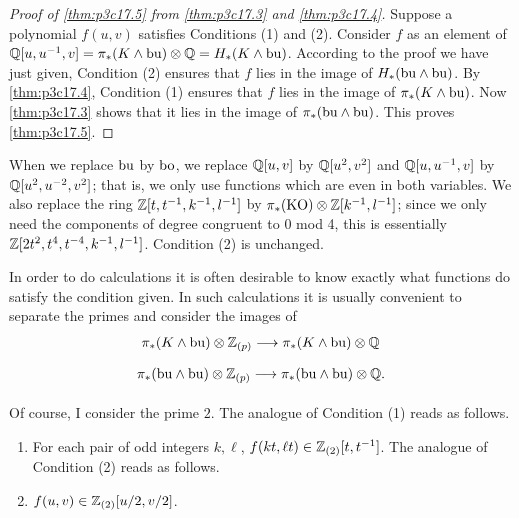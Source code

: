 \documentclass[../main]{subfiles}
\begin{document}
\begin{proof}[Proof of \ref{thm:p3c17.5} from \ref{thm:p3c17.3} and \ref{thm:p3c17.4}]
Suppose a polynomial $f(u,v)$ satisfies Conditions (1) and (2). Consider $f$ as an element of $\mathbb{Q}[u,u^{-1},v] = \pi_*(K\wedge\mathrm{bu})\otimes\mathbb{Q} = H_*(K\wedge\mathrm{bu})$. According to the proof we have just given, Condition (2) ensures that $f$ lies in the image of $H_*(\mathrm{bu}\wedge\mathrm{bu})$. By \ref{thm:p3c17.4}, Condition (1) ensures that $f$ lies in the image of $\pi_*(K\wedge\mathrm{bu})$. Now \ref{thm:p3c17.3} shows that it lies in the image of $\pi_*(\mathrm{bu}\wedge\mathrm{bu})$. This proves \ref{thm:p3c17.5}.
\end{proof}

\begin{remark*}
When we replace $\mathrm{bu}$ by $\mathrm{bo}$, we replace $\mathbb{Q}[u,v]$ by $\mathbb{Q}[u^2,v^2]$ and $\mathbb{Q}[u,u^{-1},v]$ by $\mathbb{Q}[u^2,u^{-2},v^2]$; that is, we only use functions which are even in both variables. We also replace the ring $\mathbb{Z}[t,t^{-1},k^{-1},l^{-1}]$ by $\pi_*(\mathrm{KO})\otimes\mathbb{Z}[k^{-1},l^{-1}]$; since we only need the components of degree congruent to 0 mod 4, this is essentially
$\mathbb{Z}[2t^2,t^4,t^{-4},k^{-1},l^{-1}]$. Condition (2) is unchanged.

In order to do calculations it is often desirable to know exactly what functions do satisfy the condition given. In such calculations it is usually convenient to separate the primes and consider the images of \[\pi_\ast(K\wedge\te{bu})\otimes\bbZ_{(p)}\lar{}\pi_\ast(K\wedge\te{bu})\otimes\bbQ\] \[\pi_\ast(\te{bu}\wedge\te{bu})\otimes\bbZ_{(p)}\lar{}\pi_\ast(\te{bu}\wedge\te{bu})\otimes\bbQ.\]
\end{remark*}

Of course, I consider the prime $2$. The analogue of Condition (1) reads as follows.

\begin{enumerate}
    \item[(1')] For each pair of odd integers $k, \ell$, $f(kt, \ell t) \in \mathbb{Z}_{(2)}[t, t^{-1}]$.
    The analogue of Condition (2) reads as follows.
    \item[(2')] $f(u, v) \in \mathbb{Z}_{(2)}[u/2, v/2]$.
\end{enumerate}
\end{document}
